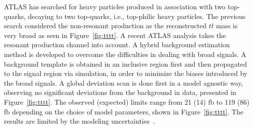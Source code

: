 \documentclass{moriond}
\begin{document}
ATLAS has searched for heavy particles produced in association with two
top-quarks, decaying to two top-quarks, i.e., top-philic heavy particles. The
previous search considered the non-resonant production as the reconstructed
$t\overline{t}$ mass is very broad as seen in
Figure~\ref{fig:tttt}. A recent ATLAS analysis takes the
resonant production channel into account. A hybrid background estimation method
is developed to overcome the difficulties in dealing with broad signals. A
background template is obtained in an inclusive region first and then
propagated to the signal region via simulation, in order to minimize the biases
introduced by the broad signals. A global deviation scan is done first in a
model agnostic way, observing no significant deviations from the background in
data, presented in Figure~\ref{fig:tttt}. The observed
(expected) limits range from 21 (14) fb to 119 (86) fb depending on the choice
of model parameters, shown in Figure~\ref{fig:tttt}. The
results are limited by the modeling uncertainties~\cite{tttt}.\\    
\end{document}
